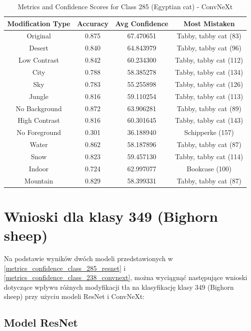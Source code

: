 \begin{table}
	\centering
	\begin{tabular}{|c|c|c|c|}
		\hline
		\textbf{Modification Type} & \textbf{Accuracy} & \textbf{Avg Confidence} & \textbf{Most Mistaken} \\
		\hline
		Original & 0.875 & 67.470651 & Tabby, tabby cat (83) \\
		\hline
		Desert & 0.840 & 64.843979 & Tabby, tabby cat (96) \\
		\hline
		Low Contrast & 0.842 & 60.234300 & Tabby, tabby cat (112) \\
		\hline
		City & 0.788 & 58.385278 & Tabby, tabby cat (134) \\
		\hline
		Sky & 0.783 & 55.255898 & Tabby, tabby cat (126) \\
		\hline
		Jungle & 0.816 & 59.110254 & Tabby, tabby cat (113) \\
		\hline
		No Background & 0.872 & 63.906281 & Tabby, tabby cat (89) \\
		\hline
		High Contrast & 0.816 & 60.301645 & Tabby, tabby cat (143) \\
		\hline
		No Foreground & 0.301 & 36.188940 & Schipperke (157) \\
		\hline
		Water & 0.862 & 58.187896 & Tabby, tabby cat (87) \\
		\hline
		Snow & 0.823 & 59.457130 & Tabby, tabby cat (114) \\
		\hline
		Indoor & 0.724 & 62.997077 & Bookcase (100) \\
		\hline
		Mountain & 0.829 & 58.399331 & Tabby, tabby cat (87) \\
		\hline
	\end{tabular}
	\caption{Metrics and Confidence Scores for Class 285 (Egyptian cat) - ConvNeXt}
	\label{tab:metrics_confidence_class_285_convnext}
\end{table}

\section*{Wnioski dla klasy 349 (Bighorn sheep)}

Na podstawie wyników dwóch modeli przedstawionych w \ref*{metrics_confidence_class_285_resnet} i \ref*{metrics_confidence_class_238_convnext}, można wyciągnąć następujące wnioski dotyczące wpływu różnych 
modyfikacji tła na klasyfikację klasy 349 (Bighorn sheep) przy użyciu modeli ResNet i ConvNeXt:

\subsection*{Model ResNet}

